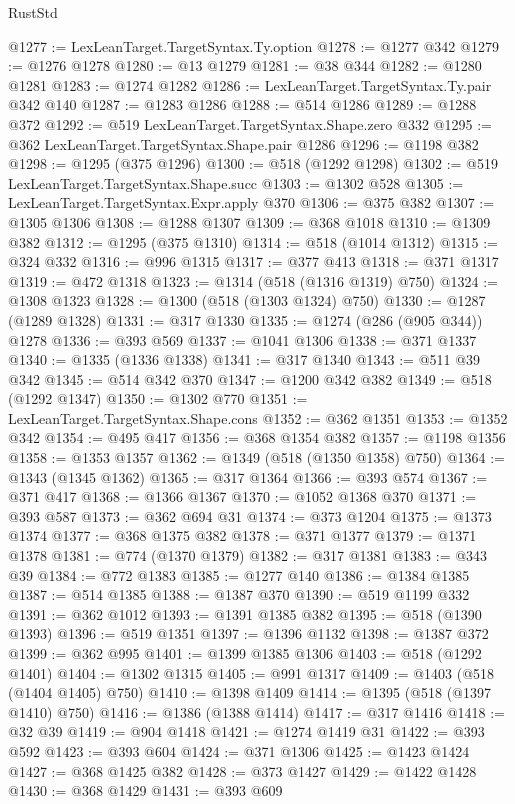\begin{lexlean}{RustStd}
\begin{coremodule}
@1277 := LexLeanTarget.TargetSyntax.Ty.option
@1278 := @1277 @342
@1279 := @1276 @1278
@1280 := @13 @1279
@1281 := @38 @344
@1282 := @1280 @1281
@1283 := @1274 @1282
@1286 := LexLeanTarget.TargetSyntax.Ty.pair @342 @140
@1287 := @1283 @1286
@1288 := @514 @1286
@1289 := @1288 @372
@1292 := @519 LexLeanTarget.TargetSyntax.Shape.zero @332
@1295 := @362 LexLeanTarget.TargetSyntax.Shape.pair @1286
@1296 := @1198 @382
@1298 := @1295 (@375 @1296)
@1300 := @518 (@1292 @1298)
@1302 := @519 LexLeanTarget.TargetSyntax.Shape.succ
@1303 := @1302 @528
@1305 := LexLeanTarget.TargetSyntax.Expr.apply @370
@1306 := @375 @382
@1307 := @1305 @1306
@1308 := @1288 @1307
@1309 := @368 @1018
@1310 := @1309 @382
@1312 := @1295 (@375 @1310)
@1314 := @518 (@1014 @1312)
@1315 := @324 @332
@1316 := @996 @1315
@1317 := @377 @413
@1318 := @371 @1317
@1319 := @472 @1318
@1323 := @1314 (@518 (@1316 @1319) @750)
@1324 := @1308 @1323
@1328 := @1300 (@518 (@1303 @1324) @750)
@1330 := @1287 (@1289 @1328)
@1331 := @317 @1330
@1335 := @1274 (@286 (@905 @344)) @1278
@1336 := @393 @569
@1337 := @1041 @1306
@1338 := @371 @1337
@1340 := @1335 (@1336 @1338)
@1341 := @317 @1340
@1343 := @511 @39 @342
@1345 := @514 @342 @370
@1347 := @1200 @342 @382
@1349 := @518 (@1292 @1347)
@1350 := @1302 @770
@1351 := LexLeanTarget.TargetSyntax.Shape.cons
@1352 := @362 @1351
@1353 := @1352 @342
@1354 := @495 @417
@1356 := @368 @1354 @382
@1357 := @1198 @1356
@1358 := @1353 @1357
@1362 := @1349 (@518 (@1350 @1358) @750)
@1364 := @1343 (@1345 @1362)
@1365 := @317 @1364
@1366 := @393 @574
@1367 := @371 @417
@1368 := @1366 @1367
@1370 := @1052 @1368 @370
@1371 := @393 @587
@1373 := @362 @694 @31
@1374 := @373 @1204
@1375 := @1373 @1374
@1377 := @368 @1375 @382
@1378 := @371 @1377
@1379 := @1371 @1378
@1381 := @774 (@1370 @1379)
@1382 := @317 @1381
@1383 := @343 @39
@1384 := @772 @1383
@1385 := @1277 @140
@1386 := @1384 @1385
@1387 := @514 @1385
@1388 := @1387 @370
@1390 := @519 @1199 @332
@1391 := @362 @1012
@1393 := @1391 @1385 @382
@1395 := @518 (@1390 @1393)
@1396 := @519 @1351
@1397 := @1396 @1132
@1398 := @1387 @372
@1399 := @362 @995
@1401 := @1399 @1385 @1306
@1403 := @518 (@1292 @1401)
@1404 := @1302 @1315
@1405 := @991 @1317
@1409 := @1403 (@518 (@1404 @1405) @750)
@1410 := @1398 @1409
@1414 := @1395 (@518 (@1397 @1410) @750)
@1416 := @1386 (@1388 @1414)
@1417 := @317 @1416
@1418 := @32 @39
@1419 := @904 @1418
@1421 := @1274 @1419 @31
@1422 := @393 @592
@1423 := @393 @604
@1424 := @371 @1306
@1425 := @1423 @1424
@1427 := @368 @1425 @382
@1428 := @373 @1427
@1429 := @1422 @1428
@1430 := @368 @1429
@1431 := @393 @609

\end{coremodule}
\end{lexlean}
